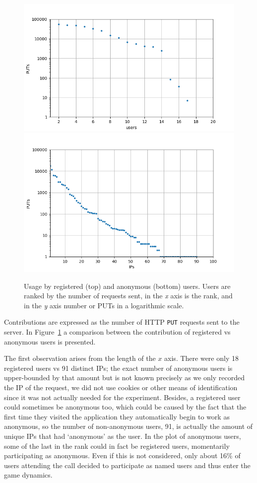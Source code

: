 \documentclass{llncs}
\begin{document}
\begin{figure}[h!tb]
    \centering
        \includegraphics[width=0.9\linewidth]{img/puts_user.png}
        \includegraphics[width=0.9\linewidth]{img/puts_ip.png}
    \caption{Usage by registered (top) and anonymous (bottom) users.  Users are ranked by
        the number of requests sent, in the \emph{x} axis is the rank, and in the \emph{y} axis
        number or PUTs in a logarithmic scale.}
      \label{fig:puts}
\end{figure}
%
Contributions are expressed as the number of HTTP {\tt PUT} requests
sent to the server. In Figure~\ref{fig:puts} a comparison between the
contribution of registered vs anonymous users is 
presented.

The first observation arises from the length of the $x$ axis. There
were only 18 registered users vs 91 distinct IPs; the 
exact number of anonymous users is upper-bounded by that amount but is
not known precisely as we only recorded the IP of the request, we did
not use cookies or other means of identification since it was not
actually needed for the experiment. Besides, a registered user
could sometimes be anonymous too, which could be caused by the fact that the first time they visited
the application they automatically begin to work as anonymous, so the
number of non-anonymous users, 91, is actually the amount of unique
IPs that had `anonymous' as the user. In the plot of 
anonymous users, some of the last in the rank could in fact be registered users,
momentarily participating as anonymous. Even if this is not considered, only
about 16\% of users attending the call decided to participate as named
users and thus enter the game dynamics. 
\end{document}
